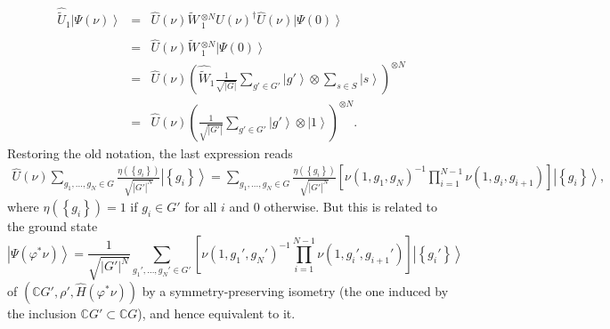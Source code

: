 \documentclass[sort&compress]{elsarticle}
\theoremstyle{theoremstyle}
\theoremstyle{framedtheoremstyle}
\theoremstyle{definitionstyle}
\theoremstyle{definitionstyle}
\theoremstyle{definitionstyle}
\theoremstyle{definitionstyle}
\theoremstyle{nameddefinitionstyle}
\theoremstyle{framednameddefinitionstyle}
\theoremstyle{proofstyle}
\theoremstyle{definitionstyle}
\newcommand{\CCC}{\mathbb{C}}
\newcommand{\bars}[1]{\left| #1 \right|}
\newcommand{\paren}[1]{\left( #1 \right)}
\newcommand{\brackets}[1]{\left[ #1 \right]}
\newcommand{\braces}[1]{\left\{ #1 \right\}}
\newcommand{\ket}[1]{\left|#1\right\rangle}
\begin{document}
\begin{appendices}
\begin{eqnarray}
\hat{\widetilde U}_1 \ket{\Psi(\nu)} &=& \hat U(\nu) \hat{\widetilde W}\,_1^{\otimes N} \hat U(\nu)^\dag \hat U(\nu) \ket{\Psi(0)} \nonumber\\
&=& \hat U(\nu) \hat{\widetilde W}\,_1^{\otimes N} \ket{\Psi(0)} \nonumber\\
&=& \hat U(\nu) \paren{ \hat{\widetilde W}_1 \frac{1}{\sqrt{\bars {G}}} \sum_{g'\in G'} \ket{g'} \otimes \sum_{s\in S} \ket{s} }^{\otimes N} \nonumber\\
&=& \hat U(\nu) \paren{ \frac{1}{\sqrt{\bars{G'}}} \sum_{g'\in G'} \ket{g'} \otimes \ket{1} }^{\otimes N}.
\end{eqnarray}
Restoring the old notation, the last expression reads
\begin{eqnarray}
\hat U(\nu) \sum_{ g_1, \ldots, g_N \in G } \frac{ \eta\paren{\braces{g_i}} }{ \sqrt{\bars{G'}^N} } \ket{ \braces{g_i} } 
= \sum_{ g_1, \ldots, g_N \in G } \frac{ \eta\paren{\braces{g_i}} }{ \sqrt{\bars{G'}^N} }
\brackets{
\nu\paren{1,g_1,g_N}^{-1} \prod_{i=1}^{N-1} \nu\paren{1, g_i, g_{i+1} }
}
\ket{ \braces{g_i} },
\end{eqnarray}
where $\eta\paren{\braces{g_i}} = 1$ if $g_i\in G'$ for all $i$ and $0$ otherwise. But this is related to the ground state
\begin{equation}
\ket{\Psi\paren{\varphi^*\nu}} = \frac{1}{ \sqrt{\bars{G'}^N} }
\sum_{ g_1', \ldots, g_N' \in G' } \brackets{ \nu\paren{1,g_1',g_N'}^{-1} \prod_{i=1}^{N-1} \nu\paren{ 1, g_i', g_{i+1}' } } \ket{ \braces{g_i'} }
\end{equation}
of $\paren{\CCC G', \rho', \hat H(\varphi^* \nu)}$ by a symmetry-preserving isometry (the one induced by the inclusion $\CCC G' \subset \CCC G$), and hence equivalent to it.


\end{appendices}
\end{document}
